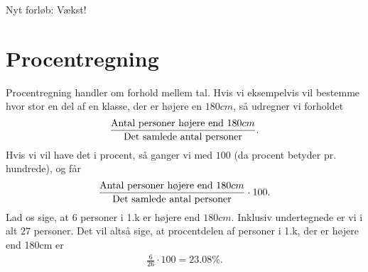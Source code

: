 \begin{center}
\Huge
Nyt forløb: Vækst!
\end{center}

\section*{Procentregning}

Procentregning handler om forhold mellem tal. Hvis vi eksempelvis vil bestemme hvor stor en del af en klasse, der er højere en $180cm$, så udregner vi forholdet 
\begin{align*}
	\frac{\textnormal{Antal personer højere end }180cm}{\textnormal{Det samlede antal personer}}.
\end{align*}
 Hvis vi vil have det i procent, så ganger vi med $100$ (da procent betyder pr. hundrede), og får
\begin{align*}
\frac{\textnormal{Antal personer højere end }180cm}{\textnormal{Det samlede antal personer}}\cdot 100.
\end{align*}
Lad os sige, at 6 personer i 1.k er højere end $180cm$. Inklusiv undertegnede er vi i alt $27$ personer. Det vil altså sige, at procentdelen af personer i 1.k, der er højere end 180cm er 
\begin{align*}
\frac{6}{26}\cdot 100 = 23.08\%.
\end{align*}
